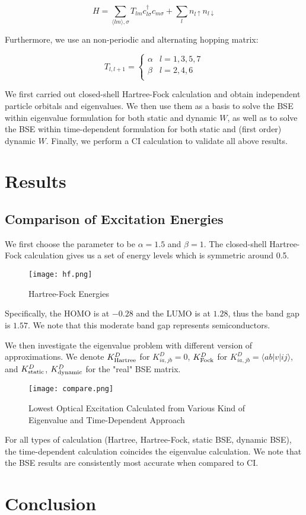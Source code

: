 \documentclass{article}
\begin{document}
$$
H=\sum_{\langle lm\rangle,\sigma}T_{lm}c_{l\sigma}^{\dagger}c_{m\sigma}+ \sum_{l}n_{l\uparrow}n_{l\downarrow}
$$

Furthermore, we use an non-periodic and alternating hopping matrix:

$$
T_{l,l+1}=
\begin{cases}
\alpha&l=1,3,5,7\\
\beta&l=2,4,6\\
\end{cases}
$$

We first carried out closed-shell Hartree-Fock calculation and obtain independent particle orbitals and eigenvalues. We then use them as a basis to solve the BSE within eigenvalue formulation for both static and dynamic $W$, as well as to solve the BSE within time-dependent formulation for both static and (first order) dynamic $W$. Finally, we perform a CI calculation to validate all above results.

\section{Results}
\subsection{Comparison of Excitation Energies}

We first choose the parameter to be $\alpha=1.5$ and $\beta=1$. The closed-shell Hartree-Fock calculation gives us a set of energy levels which is symmetric around 0.5.

\begin{figure}[!ht]
    \centering
    \texttt{[image: hf.png]}
    \caption{Hartree-Fock Energies}
\end{figure}

Specifically, the HOMO is at $-0.28$ and the LUMO is at $1.28$, thus the band gap is $1.57$. We note that this moderate band gap represents semiconductors. 

We then investigate the eigenvalue problem with different version of approximations. We denote $K^{D}_{\rm Hartree}$ for $K^{D}_{ia,jb}=0$, $K^{D}_{\rm Fock}$ for $K^{D}_{ia,jb}=\langle ab|v|ij\rangle$, and $K^D_{\rm static}$, $K^D_{\rm dynamic}$ for the "real" BSE matrix.

\begin{figure}
    \centering
    \texttt{[image: compare.png]}
    \caption{Lowest Optical Excitation Calculated from Various Kind of Eigenvalue and Time-Dependent Approach}
\end{figure}

For all types of calculation (Hartree, Hartree-Fock, static BSE, dynamic BSE), the time-dependent calculation coincides the eigenvalue calculation. We note that the BSE results are consistently most accurate when compared to CI.

\section{Conclusion}
\end{document}
